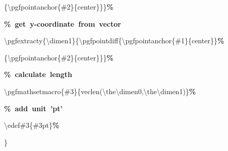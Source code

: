 {{\rule[-0.5ex]{0pt}{2.5ex}\hspace*{18.5em}\{\textbackslash{}pgfpointanchor\{\#2\}\{center\}\}\}\textcolor{G}{\textbf{\%}}\\
\rule[-0.5ex]{0pt}{2.5ex}\hspace*{1.0em}\textcolor{G}{\textbf{\%~get~y{-}coordinate~from~vector}}\\
\rule[-0.5ex]{0pt}{2.5ex}\hspace*{1.0em}\textbackslash{}pgfextracty\{\textbackslash{}dimen1\}\{\textbackslash{}pgfpointdiff\{\textbackslash{}pgfpointanchor\{\#1\}\{center\}\}\textcolor{G}{\textbf{\%}}\\
\rule[-0.5ex]{0pt}{2.5ex}\hspace*{18.5em}\{\textbackslash{}pgfpointanchor\{\#2\}\{center\}\}\}\textcolor{G}{\textbf{\%}}\\
\rule[-0.5ex]{0pt}{2.5ex}\hspace*{1.0em}\textcolor{G}{\textbf{\%~calculate~length}}\\
\rule[-0.5ex]{0pt}{2.5ex}\hspace*{1.0em}\textbackslash{}pgfmathsetmacro\{\#3\}\{veclen(\textbackslash{}the\textbackslash{}dimen0,\textbackslash{}the\textbackslash{}dimen1)\}\textcolor{G}{\textbf{\%}}\\
\rule[-0.5ex]{0pt}{2.5ex}\hspace*{1.0em}\textcolor{G}{\textbf{\%~add~unit~'pt'}}\\
\rule[-0.5ex]{0pt}{2.5ex}\hspace*{1.0em}\textbackslash{}edef\#3\{\#3pt\}\textcolor{G}{\textbf{\%}}\\
\rule[-0.5ex]{0pt}{2.5ex}\hspace*{0.0em}\}}%
}%
\endgroup
